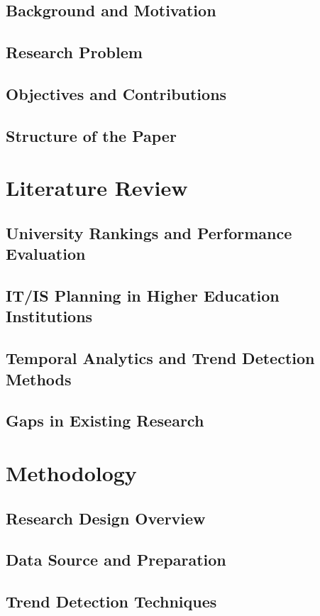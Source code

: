 \documentclass{singlecol-new}
\theoremstyle{TH}{
\newtheorem{lemma}{Lemma}
\newtheorem{theorem}[lemma]{Theorem}
\newtheorem{corrolary}[lemma]{Corrolary}
\newtheorem{conjecture}[lemma]{Conjecture}
\newtheorem{proposition}[lemma]{Proposition}
\newtheorem{claim}[lemma]{Claim}
\newtheorem{stheorem}[lemma]{Wrong Theorem}
\newtheorem{algorithm}{Algorithm}
}
\theoremstyle{THrm}{
\newtheorem{definition}{Definition}[section]
\newtheorem{question}{Question}[section]
\newtheorem{remark}{Remark}
\newtheorem{scheme}{Scheme}
}
\theoremstyle{THhit}{
\newtheorem{case}{Case}[section]
}
\begin{document}
\subsection{Background and Motivation}
\subsection{Research Problem}
\subsection{Objectives and Contributions}
\subsection{Structure of the Paper}

\section{Literature Review}
\subsection{University Rankings and Performance Evaluation}
\subsection{IT/IS Planning in Higher Education Institutions}
\subsection{Temporal Analytics and Trend Detection Methods}
\subsection{Gaps in Existing Research}

\section{Methodology}
\subsection{Research Design Overview}
\subsection{Data Source and Preparation}
\subsection{Trend Detection Techniques}
\end{document}
